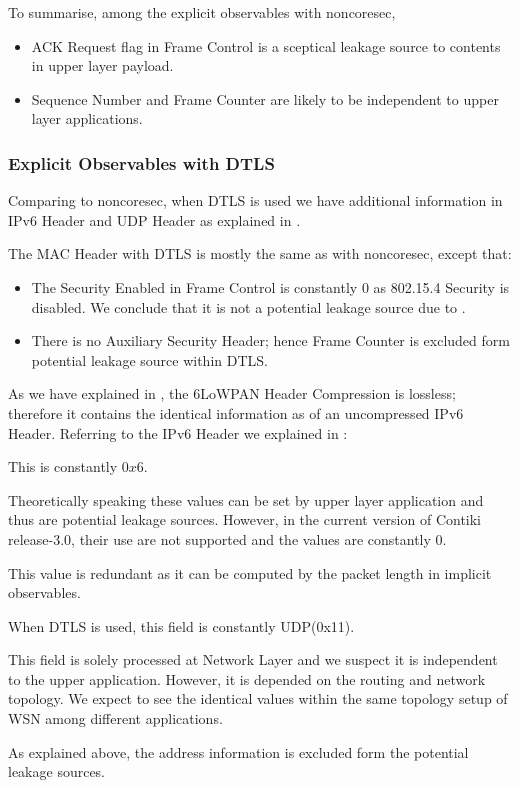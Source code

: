 To summarise, among the explicit observables with noncoresec,

\begin{itemize}
	\item ACK Request flag in Frame Control is a sceptical leakage source to contents in upper layer payload.
	\item Sequence Number and Frame Counter are likely to be independent to upper layer applications.
\end{itemize}

\subsubsection{Explicit Observables with DTLS}

Comparing to noncoresec, when DTLS is used we have additional information in IPv6 Header and UDP Header as explained in .

The MAC Header with DTLS is mostly the same as with noncoresec, except that:

\begin{itemize}
	\item The Security Enabled in Frame Control is constantly $0$ as 802.15.4 Security is disabled. We conclude that it is not a potential leakage source due to .
	\item There is no Auxiliary Security Header; hence Frame Counter is excluded form potential leakage source within DTLS.
\end{itemize}

As we have explained in , the 6LoWPAN Header Compression is lossless; therefore it contains the identical information as of an uncompressed IPv6 Header. Referring to the IPv6 Header we explained in :

\begin{description}[style=nextline]
	\item[Version]
	This is constantly $0x6$.
	\item[Traffic Class and Flow Label]
	Theoretically speaking these values can be set by upper layer application and thus are potential leakage sources. However, in the current version of Contiki release-3.0, their use are not supported and the values are constantly $0$.
	\item[Payload Length]
	This value is redundant as it can be computed by the packet length in implicit observables.
	\item[Next Header]
	When DTLS is used, this field is constantly UDP(0x11).
	\item[Hop Limit]
	This field is solely processed at Network Layer and we suspect it is independent to the upper application. However, it is depended on the routing and network topology. We expect to see the identical values within the same topology setup of WSN among different applications.
	\item[Source and Destination Address]
	As explained above, the address information is excluded form the potential leakage sources.
\end{description}

